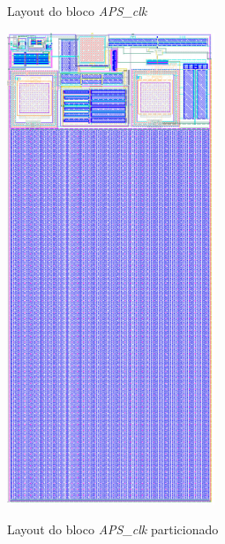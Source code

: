 \begin{figure}[!h]
 \centering
    \begin{minipage}{0.5\textwidth}
    \centering
    \caption{Layout do bloco \textit{APS\_clk}} 
    \includegraphics[scale=0.7]{Projeto/Layout/Imagens/TIA.png}
    \label{layoutTIA}
    \end{minipage}
    \hfill
    \begin{minipage}{0.4\textwidth}
    \centering
    \caption{Layout do bloco \textit{APS\_clk} particionado}

\end{minipage}
\end{figure}
